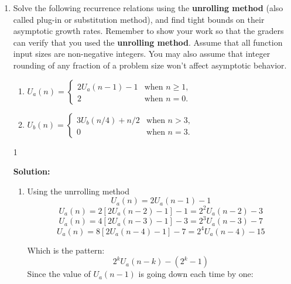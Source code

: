 \documentclass[9pt]{article}
\def\solutions{1}
\begin{document}
\begin{enumerate}

\item Solve the following recurrence relations using the \textbf{unrolling method} (also called plug-in or substitution method), and find tight bounds on their asymptotic growth rates.  Remember to show your work so that the graders can verify that you used the \textbf{unrolling method}.  Assume that all function input sizes are non-negative integers.  You may also assume that integer rounding of any fraction of a problem size won't affect asymptotic behavior.
  \begin{enumerate}
  \item $U_a(n) = \begin{cases}
    2U_a(n-1)-1 & \text{when } n\ge1,\\
    2 & \text{when } n=0.
  \end{cases}$
  \item $U_b(n) = \begin{cases}
    3U_b(n/4)+n/2 & \text{when } n>3,\\
    0 & \text{when } n=3.
  \end{cases}$
  \end{enumerate}

\if\solutions1
\vspace{2mm}

\textbf{Solution:}   \\
\begin{enumerate}
  \item Using the unrrolling method
  $$U_a(n) = 2U_a(n-1)-1 $$
  $$U_a(n) = 2[2U_a(n-2)-1]-1 = 2^2U_a(n-2)-3$$
  $$U_a(n) = 4[2U_a(n-3)-1]-3 = 2^3U_a(n-3)-7$$
  $$U_a(n) = 8[2U_a(n-4)-1]-7 = 2^4U_a(n-4)-15$$
  \begin{center} Which is the pattern:
  $$2^kU_a(n-k)-(2^k-1)$$
  Since the value of $U_a(n-1)$ is going down each time by one:


\end{center}
\end{enumerate}
\end{enumerate}
\end{document}
